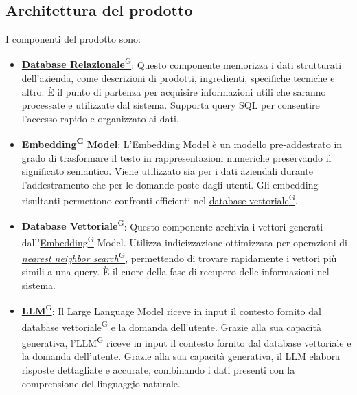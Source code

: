 \subsection{Architettura del prodotto}
I componenti del prodotto sono:
\begin{itemize}
    \item \href{https://code7crusaders.github.io/docs/PB/documentazione_interna/glossario.html#database-relazionale}{\textbf{Database Relazionale}\textsuperscript{G}}:  
    Questo componente memorizza i dati strutturati dell’azienda, come descrizioni di prodotti, ingredienti, specifiche tecniche e altro. È il punto di partenza per acquisire informazioni utili che saranno processate e utilizzate dal sistema. Supporta query SQL per consentire l'accesso rapido e organizzato ai dati.
    
    \item \href{https://code7crusaders.github.io/docs/PB/documentazione_interna/glossario.html#embedding}{\textbf{Embedding\textsuperscript{G}} } \textbf{Model}:  
    L’Embedding Model è un modello pre-addestrato in grado di trasformare il testo in rappresentazioni numeriche preservando il significato semantico. Viene utilizzato sia per i dati aziendali durante l’addestramento che per le domande poste dagli utenti. Gli embedding risultanti permettono confronti efficienti nel \href{https://code7crusaders.github.io/docs/PB/documentazione_interna/glossario.html#database-vettoriale}{database vettoriale\textsuperscript{G}}.
    
    \item \href{https://code7crusaders.github.io/docs/PB/documentazione_interna/glossario.html#database-vettoriale}{\textbf{Database Vettoriale}\textsuperscript{G}}:  
    Questo componente archivia i vettori generati dall’\href{https://code7crusaders.github.io/docs/PB/documentazione_interna/glossario.html#embedding}{Embedding\textsuperscript{G}} Model. Utilizza indicizzazione ottimizzata per operazioni di \href{https://code7crusaders.github.io/docs/PB/documentazione_interna/glossario.html#nearest-neighbor-search-nns}{\textit{nearest neighbor search}\textsuperscript{G}}, permettendo di trovare rapidamente i vettori più simili a una query. È il cuore della fase di recupero delle informazioni nel sistema.
    
    \item \href{https://code7crusaders.github.io/docs/PB/documentazione_interna/glossario.html#llm-large-language-model}{\textbf{LLM}\textsuperscript{G}}:  
    Il Large Language Model riceve in input il contesto fornito dal \href{https://code7crusaders.github.io/docs/PB/documentazione_interna/glossario.html#database-vettoriale}{database vettoriale\textsuperscript{G}} e la domanda dell’utente. Grazie alla sua capacità generativa, l'\href{https://code7crusaders.github.io/docs/PB/documentazione_interna/glossario.html#llm-large-language-model}{LLM\textsuperscript{G}} riceve in input il contesto fornito dal database vettoriale e la domanda dell’utente. Grazie alla sua capacità generativa, il LLM elabora risposte dettagliate e accurate, combinando i dati presenti con la comprensione del linguaggio naturale.
    

\end{itemize}
